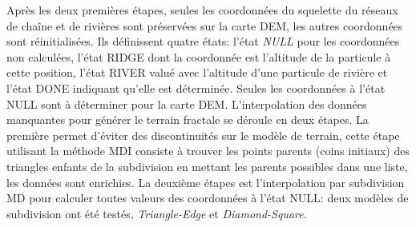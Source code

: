 \documentclass[11pt]{article}
\begin{document}
Après les deux premières étapes, seules les coordonnées du squelette du réseaux de chaîne et de rivières sont préservées sur la carte DEM, les autres coordonnées sont réinitialisées. Ils définissent quatre états: l'état \textit{NULL} pour les coordonnées non calculées, l'état RIDGE dont la coordonnée est l'altitude de la particule à cette position, l'état RIVER valué avec l'altitude d'une particule de rivière et l'état DONE indiquant qu'elle est déterminée. Seules les coordonnées à l'état NULL sont à déterminer pour la carte DEM. L'interpolation des données manquantes pour générer le terrain fractale se déroule en deux étapes. La première permet d'éviter des discontinuités sur le modèle de terrain, cette étape utilisant la méthode MDI consiste à trouver les points parents (coins initiaux) des triangles enfants de la subdivision en mettant les parents possibles dans une liste, les données sont enrichies. La deuxième étapes est l'interpolation par subdivision MD pour calculer toutes valeurs des coordonnées à l'état NULL: deux modèles de subdivision ont été testés, \textit{Triangle-Edge} et \textit{Diamond-Square}. 
\end{document}
